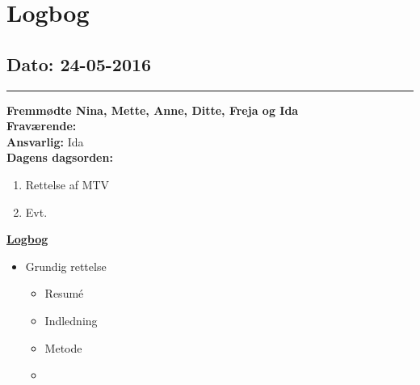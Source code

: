 \chapter{Logbog}
\section{Dato: 24-05-2016}
\hrule
\textbf{Fremmødte Nina, Mette, Anne, Ditte, Freja og Ida } \\
\textbf{Fraværende: } \\
\textbf{Ansvarlig:} Ida  \\
\textbf{Dagens dagsorden: }
\begin{enumerate}
\item Rettelse af MTV
\item Evt.
\end{enumerate}

\underline{\textbf{Logbog}}
\begin{itemize}
\item Grundig rettelse
\begin{itemize}
\item Resumé
\item Indledning
\item Metode
\item 
\end{itemize}
\end{itemize}
\newpage